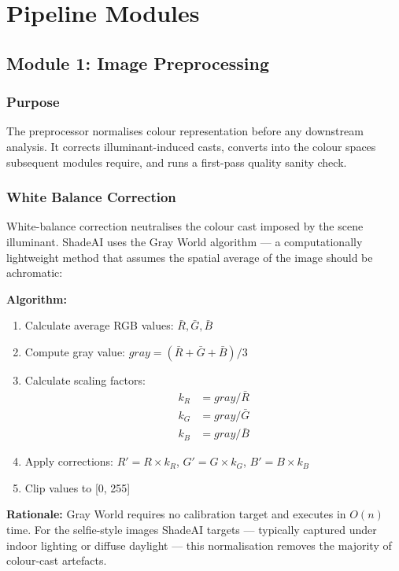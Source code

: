 \section{Pipeline Modules}

\subsection{Module 1: Image Preprocessing}

\subsubsection{Purpose}
The preprocessor normalises colour representation before any downstream analysis. It corrects illuminant-induced casts, converts into the colour spaces subsequent modules require, and runs a first-pass quality sanity check.

\subsubsection{White Balance Correction}

White-balance correction neutralises the colour cast imposed by the scene illuminant. ShadeAI uses the Gray World algorithm — a computationally lightweight method that assumes the spatial average of the image should be achromatic:

\textbf{Algorithm:}
\begin{enumerate}
    \item Calculate average RGB values: $\bar{R}, \bar{G}, \bar{B}$
    \item Compute gray value: $gray = (\bar{R} + \bar{G} + \bar{B}) / 3$
    \item Calculate scaling factors:
    \begin{align}
        k_R &= gray / \bar{R} \\
        k_G &= gray / \bar{G} \\
        k_B &= gray / \bar{B}
    \end{align}
    \item Apply corrections: $R' = R \times k_R$, $G' = G \times k_G$, $B' = B \times k_B$
    \item Clip values to [0, 255]
\end{enumerate}

\textbf{Rationale:} Gray World requires no calibration target and executes in $O(n)$ time. For the selfie-style images ShadeAI targets — typically captured under indoor lighting or diffuse daylight — this normalisation removes the majority of colour-cast artefacts.

